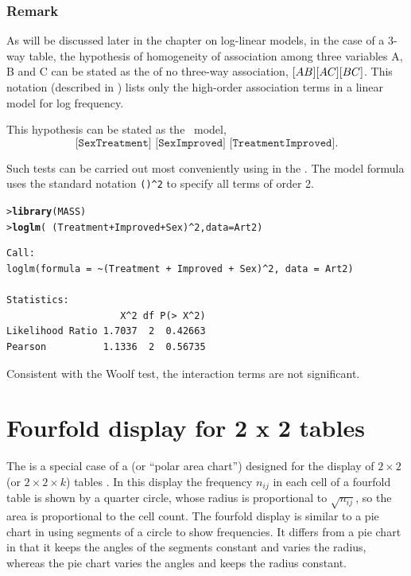 \documentclass[10pt,krantz2]{krantz}\usepackage[]{graphicx}\usepackage[]{color}
\makeatletter
\newcommand{\hlnum}[1]{\textcolor[rgb]{0.686,0.059,0.569}{#1}}%
\newcommand{\hlopt}[1]{\textcolor[rgb]{0,0,0}{#1}}%
\newcommand{\hlstd}[1]{\textcolor[rgb]{0.345,0.345,0.345}{#1}}%
\newcommand{\hlkwc}[1]{\textcolor[rgb]{0.333,0.667,0.333}{#1}}%
\newcommand{\hlkwd}[1]{\textcolor[rgb]{0.737,0.353,0.396}{\textbf{#1}}}%
\newenvironment{kframe}{%
 \def\at@end@of@kframe{}%
 \ifinner\ifhmode%
  \def\at@end@of@kframe{\end{minipage}}%
  \begin{minipage}{\columnwidth}%
 \fi\fi%
 \def\FrameCommand##1{\hskip\@totalleftmargin \hskip-\fboxsep
 \colorbox{shadecolor}{##1}\hskip-\fboxsep
     \hskip-\linewidth \hskip-\@totalleftmargin \hskip\columnwidth}%
 \MakeFramed {\advance\hsize-\width
   \@totalleftmargin\z@ \linewidth\hsize
   \@setminipage}}%
 {\par\unskip\endMakeFramed%
 \at@end@of@kframe}
\newenvironment{knitrout}{}{} %
\renewenvironment{knitrout}{\small\renewcommand{\baselinestretch}{.85}}{} %
\makeatother
\begin{document}
\subsubsection*{Remark}
As will be discussed later in the chapter on log-linear models, 
in the case of a 3-way table, the hypothesis of homogeneity of
association among three variables A, B and C can be stated as the
 of no three-way association,
$[AB] [AC] [BC]$.
This notation (described in )
lists only the high-order association
terms in a linear model for log frequency.

This hypothesis can be stated
as the \loglin\ model,
\begin{equation}\label{eq:STO2}
 \texttt{[SexTreatment] [SexImproved] [TreatmentImproved]}
 \period
\end{equation}

Such tests can be carried out most conveniently using
 in the .  The model formula
uses the standard \R notation \verb|()^2| to specify all
terms of order 2.
\begin{knitrout}
\color{fgcolor}\begin{kframe}
\begin{alltt}
\hlstd{> }\hlkwd{library}\hlstd{(MASS)}
\hlstd{> }\hlkwd{loglm}\hlstd{(}\hlopt{~} \hlstd{(Treatment} \hlopt{+} \hlstd{Improved} \hlopt{+} \hlstd{Sex)} \hlopt{^} \hlnum{2}\hlstd{,} \hlkwc{data} \hlstd{= Art2)}
\end{alltt}
\begin{verbatim}
Call:
loglm(formula = ~(Treatment + Improved + Sex)^2, data = Art2)

Statistics:
                    X^2 df P(> X^2)
Likelihood Ratio 1.7037  2  0.42663
Pearson          1.1336  2  0.56735
\end{verbatim}
\end{kframe}
\end{knitrout}
\noindent Consistent with the Woolf test, the interaction terms are not significant.

\section{Fourfold display for 2 x 2 tables}\label{sec:twoway-fourfold}

The  is a special case of a
 (or ``polar area chart'')
designed for the display of $2 \times 2$ (or $2 \times 2 \times k$)
tables
\citep{Fienberg:75,Friendly:94b,Friendly:94c}.
In this display the frequency
\(n_{ij}\) in each cell of a fourfold table is shown by a quarter
circle, whose radius is proportional to \(\sqrt { n_{ij} }\), so the
area is proportional to the cell count.
The fourfold display
is similar to a pie chart in using segments of
a circle to show frequencies.  It
differs from a pie chart in that it keeps the
angles of the segments constant and varies the radius,
whereas the pie chart varies the angles and keeps the radius constant.
\end{document}
